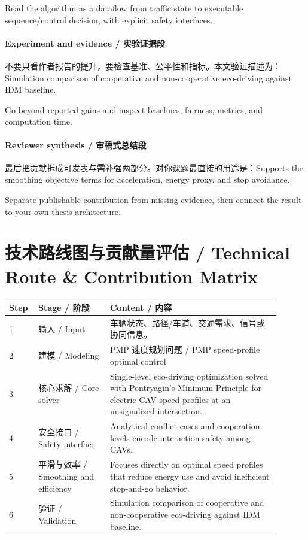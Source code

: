 \documentclass[UTF8,a4paper,11pt,fontset=fandol]{ctexart}
\begin{document}
Read the algorithm as a dataflow from traffic state to executable sequence/control decision, with explicit safety interfaces.

\paragraph{Experiment and evidence / 实验证据段}不要只看作者报告的提升，要检查基准、公平性和指标。本文验证描述为：Simulation comparison of cooperative and non-cooperative eco-driving against IDM baseline.

Go beyond reported gains and inspect baselines, fairness, metrics, and computation time.

\paragraph{Reviewer synthesis / 审稿式总结段}最后把贡献拆成可发表与需补强两部分。对你课题最直接的用途是：Supports the smoothing objective terms for acceleration, energy proxy, and stop avoidance.

Separate publishable contribution from missing evidence, then connect the result to your own thesis architecture.


\section{技术路线图与贡献量评估 / Technical Route \& Contribution Matrix}
\begin{longtable}{p{0.08\linewidth}p{0.24\linewidth}p{0.58\linewidth}}
\toprule
Step & Stage / 阶段 & Content / 内容\\
\midrule
1 & 输入 / Input & 车辆状态、路径/车道、交通需求、信号或协同信息。 \\
2 & 建模 / Modeling & PMP 速度规划问题 / PMP speed-profile optimal control \\
3 & 核心求解 / Core solver & Single-level eco-driving optimization solved with Pontryagin's Minimum Principle for electric CAV speed profiles at an unsignalized intersection. \\
4 & 安全接口 / Safety interface & Analytical conflict cases and cooperation levels encode interaction safety among CAVs. \\
5 & 平滑与效率 / Smoothing and efficiency & Focuses directly on optimal speed profiles that reduce energy use and avoid inefficient stop-and-go behavior. \\
6 & 验证 / Validation & Simulation comparison of cooperative and non-cooperative eco-driving against IDM baseline. \\
\bottomrule
\end{longtable}
\end{document}
